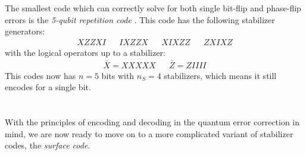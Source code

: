 The smallest code which can correctly solve for both single bit-flip and phase-flip errors is the \emph{5-qubit repetition code} \cite{laflamme1996perfect}. This code has the following stabilizer generators:
\begin{align}
  XZZXI && IXZZX && XIXZZ && ZXIXZ
\end{align}
with the logical operators up to a stabilizer:
\begin{align}
  & \bar{X} = XXXXX && \bar{Z} = ZIIII &
\end{align}
This codes now has $n=5$ bits with $n_S = 4$ stabilizers, which means it still encodes for a single bit.\\
\\
\\
With the principles of encoding and decoding in the quantum error correction in mind, we are now ready to move on to a more complicated variant of stabilizer codes, the \emph{surface code}. 


